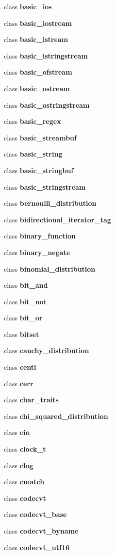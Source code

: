 \begin{DoxyCompactItemize}
\item 
class {\bf basic\+\_\+ios}
\item 
class {\bf basic\+\_\+iostream}
\item 
class {\bf basic\+\_\+istream}
\item 
class {\bf basic\+\_\+istringstream}
\item 
class {\bf basic\+\_\+ofstream}
\item 
class {\bf basic\+\_\+ostream}
\item 
class {\bf basic\+\_\+ostringstream}
\item 
class {\bf basic\+\_\+regex}
\item 
class {\bf basic\+\_\+streambuf}
\item 
class {\bf basic\+\_\+string}
\item 
class {\bf basic\+\_\+stringbuf}
\item 
class {\bf basic\+\_\+stringstream}
\item 
class {\bf bernoulli\+\_\+distribution}
\item 
class {\bf bidirectional\+\_\+iterator\+\_\+tag}
\item 
class {\bf binary\+\_\+function}
\item 
class {\bf binary\+\_\+negate}
\item 
class {\bf binomial\+\_\+distribution}
\item 
class {\bf bit\+\_\+and}
\item 
class {\bf bit\+\_\+not}
\item 
class {\bf bit\+\_\+or}
\item 
class {\bf bitset}
\item 
class {\bf cauchy\+\_\+distribution}
\item 
class {\bf centi}
\item 
class {\bf cerr}
\item 
class {\bf char\+\_\+traits}
\item 
class {\bf chi\+\_\+squared\+\_\+distribution}
\item 
class {\bf cin}
\item 
class {\bf clock\+\_\+t}
\item 
class {\bf clog}
\item 
class {\bf cmatch}
\item 
class {\bf codecvt}
\item 
class {\bf codecvt\+\_\+base}
\item 
class {\bf codecvt\+\_\+byname}
\item 
class {\bf codecvt\+\_\+utf16}

\end{DoxyCompactItemize}
